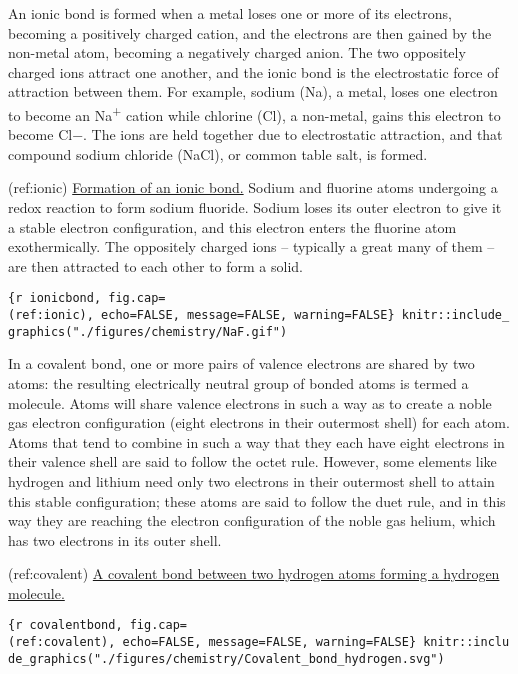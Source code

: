 \documentclass[
]{article}
\begin{document}
An ionic bond is formed when a metal loses one or more of its electrons,
becoming a positively charged cation, and the electrons are then gained
by the non-metal atom, becoming a negatively charged anion. The two
oppositely charged ions attract one another, and the ionic bond is the
electrostatic force of attraction between them. For example, sodium
(Na), a metal, loses one electron to become an Na\textsuperscript{+}
cation while chlorine (Cl), a non-metal, gains this electron to become
Cl−. The ions are held together due to electrostatic attraction, and
that compound sodium chloride (NaCl), or common table salt, is formed.

(ref:ionic)
\href{https://commons.wikimedia.org/wiki/File:NaF.gif}{Formation of an
ionic bond.} Sodium and fluorine atoms undergoing a redox reaction to
form sodium fluoride. Sodium loses its outer electron to give it a
stable electron configuration, and this electron enters the fluorine
atom exothermically. The oppositely charged ions -- typically a great
many of them -- are then attracted to each other to form a solid.

\texttt{\{r\ ionicbond,\ fig.cap=\textquotesingle{}(ref:ionic)\textquotesingle{},\ echo=FALSE,\ message=FALSE,\ warning=FALSE\}\ knitr::include\_graphics("./figures/chemistry/NaF.gif")}

In a covalent bond, one or more pairs of valence electrons are shared by
two atoms: the resulting electrically neutral group of bonded atoms is
termed a molecule. Atoms will share valence electrons in such a way as
to create a noble gas electron configuration (eight electrons in their
outermost shell) for each atom. Atoms that tend to combine in such a way
that they each have eight electrons in their valence shell are said to
follow the octet rule. However, some elements like hydrogen and lithium
need only two electrons in their outermost shell to attain this stable
configuration; these atoms are said to follow the duet rule, and in this
way they are reaching the electron configuration of the noble gas
helium, which has two electrons in its outer shell.

(ref:covalent)
\href{https://commons.wikimedia.org/wiki/File:Covalent_bond_hydrogen.svg}{A
covalent bond between two hydrogen atoms forming a hydrogen molecule.}

\texttt{\{r\ covalentbond,\ fig.cap=\textquotesingle{}(ref:covalent)\textquotesingle{},\ echo=FALSE,\ message=FALSE,\ warning=FALSE\}\ knitr::include\_graphics("./figures/chemistry/Covalent\_bond\_hydrogen.svg")}
\end{document}
